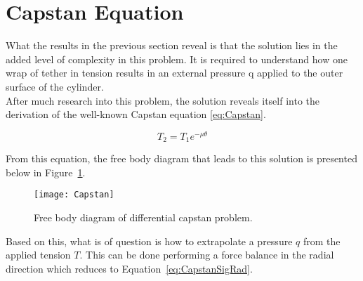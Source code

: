 
\section{Capstan Equation}
What the results in the previous section reveal is that the solution lies in the added level of complexity in this problem. It is required to understand how one wrap of tether in tension results in an external pressure q applied to the outer surface of the cylinder.\\

After much research into this problem, the solution reveals itself into the derivation of the well-known Capstan equation \ref{eq:Capstan}.

\begin{equation}
	\label{eq:Capstan}
	T_2 = T_1 e^{-\mu\theta}
\end{equation}


From this equation, the free body diagram that leads to this solution is presented below in Figure~\ref{fig:Capstan}. 

\begin{figure}[!htbp]
	\centering
	\texttt{[image: Capstan]}
	\caption{Free body diagram of differential capstan problem.}
	\label{fig:Capstan}
\end{figure}

Based on this, what is of question is how to extrapolate a pressure $q$ from the applied tension $T$. This can be done performing a force balance in the radial direction which reduces to Equation~\ref{eq:CapstanSigRad}.


